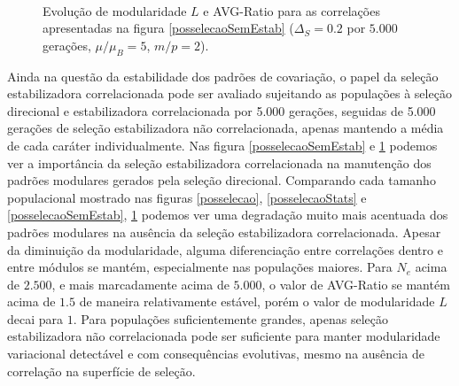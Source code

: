 \begin{figure}[htbp]
    \vspace{-18pt}
    \vspace{11pt}
    \\
    \caption{Evolução de modularidade $L$ e AVG-Ratio para as
    correlações apresentadas na figura \ref{posselecaoSemEstab}
    ($\Delta_S = 0.2$ por $5.000$ gerações, $\mu/\mu_B=5$, $m/p=2$).}
    \label{posselecaoSemEstabStats}
\end{figure}

Ainda na questão da estabilidade dos padrões de covariação, o papel da
seleção estabilizadora correlacionada pode ser avaliado sujeitando as
populações à seleção direcional e estabilizadora correlacionada por 5.000
gerações, seguidas de 5.000 gerações de seleção estabilizadora não
correlacionada, apenas mantendo a média de cada caráter individualmente.
Nas figura \ref{posselecaoSemEstab} e \ref{posselecaoSemEstabStats}
podemos ver a importância da seleção estabilizadora correlacionada na
manutenção dos padrões modulares gerados pela seleção direcional.
Comparando cada tamanho populacional mostrado nas figuras
\ref{posselecao}, \ref{posselecaoStats} e \ref{posselecaoSemEstab},
\ref{posselecaoSemEstabStats} podemos ver uma degradação muito mais
acentuada dos padrões modulares na ausência da seleção
estabilizadora correlacionada.
Apesar da diminuição da modularidade, alguma diferenciação entre
correlações dentro e entre módulos se mantém, especialmente nas
populações maiores.
Para $N_e$ acima de $2.500$, e mais marcadamente acima de $5.000$, o
valor de AVG-Ratio se mantém acima de $1.5$ de maneira relativamente
estável, porém o valor de modularidade $L$ decai para $1$.
Para populações suficientemente grandes, apenas seleção estabilizadora
não correlacionada pode ser suficiente para manter modularidade
variacional detectável e com consequências evolutivas, mesmo na ausência
de correlação na superfície de seleção.

